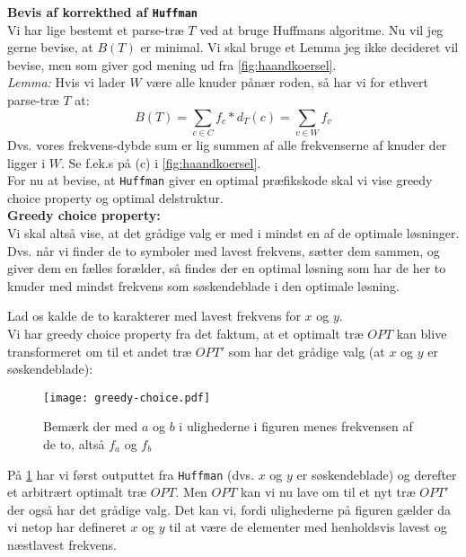 \textbf{Bevis af korrekthed af \texttt{Huffman}}\\
Vi har lige bestemt et parse-træ $T$ ved at bruge Huffmans algoritme. Nu vil jeg gerne bevise, at $B(T)$ er minimal. Vi skal bruge et Lemma jeg ikke decideret vil bevise, men som giver god mening ud fra \ref{fig:haandkoersel}.\\

\textit{Lemma:} Hvis vi lader $W$ være alle knuder pånær roden, så har vi for ethvert parse-træ $T$ at:
$$
B(T) = \sum_{c \in C} f_c * d_T(c) = \sum_{v \in W} f_v
$$
Dvs. vores frekvens-dybde sum er lig summen af alle frekvenserne af knuder der ligger i $W$. Se f.ek.s på (c) i \ref{fig:haandkoersel}.\\


For nu at bevise, at \texttt{Huffman} giver en optimal præfikskode skal vi vise greedy choice property og optimal delstruktur.\\







\textbf{Greedy choice property:}\\
Vi skal altså vise, at det grådige valg er med i mindst en af de optimale løsninger. Dvs. når vi finder de to symboler med lavest frekvens, sætter dem sammen, og giver dem en fælles forælder, så findes der en optimal løsning som har de her to knuder med mindst frekvens som søskendeblade i den optimale løsning.

Lad os kalde de to karakterer med lavest frekvens for $x$ og $y$.\\

Vi har greedy choice property fra det faktum, at et optimalt træ $OPT$ kan blive transformeret om til et andet træ $OPT'$ som har det grådige valg (at $x$ og $y$ er søskendeblade):

\begin{figure}[H]
	\begin{center}
		\texttt{[image: greedy-choice.pdf]}
	\end{center}
	\caption{Bemærk der med $a$ og $b$ i ulighederne i figuren menes frekvensen af de to, altså $f_a$ og $f_b$}
	\label{fig:greedy-choice}
\end{figure}

På \ref{fig:greedy-choice} har vi først outputtet fra \texttt{Huffman} (dvs. $x$ og $y$ er søskendeblade) og derefter et arbitrært optimalt træ $OPT$. Men $OPT$ kan vi nu lave om til et nyt træ $OPT'$ der også har det grådige valg. Det kan vi, fordi ulighederne på figuren gælder da vi netop har defineret $x$ og $y$ til at være de elementer med henholdsvis lavest og næstlavest frekvens.\\

